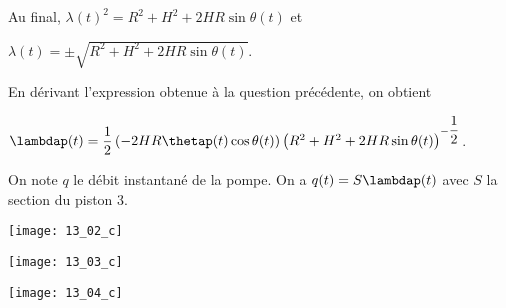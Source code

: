 Au final, 
$\lambda(t)^2 =  R^2  +H^2 +2 HR\sin\theta(t)$ et 

$\lambda(t) = \pm\sqrt{ R^2  +H^2 +2 HR\sin\theta(t)}$.
\else
\fi


\ifprof

En dérivant l'expression obtenue à la question précédente, on obtient 

$\lambdap(t) = \dfrac{1}{2}\left(-  2 HR\thetap(t)\cos\theta(t)\right)\left(R^2  +H^2 +2 HR\sin\theta(t)\right)^{-\dfrac{1}{2}}$.


\else
\fi



\ifprof
On note $q$ le débit instantané de la pompe. 
On a $q(t)=S\lambdap(t)$ avec $S$ la section du piston 3. 

\else
\fi


\ifprof

\begin{minipage}[c]{.3\linewidth}
\texttt{[image: 13\_02\_c]}
\end{minipage}
\hfill
\begin{minipage}[c]{.3\linewidth}
\texttt{[image: 13\_03\_c]}
\end{minipage}
\hfill
\begin{minipage}[c]{.3\linewidth}
\texttt{[image: 13\_04\_c]}
\end{minipage}



